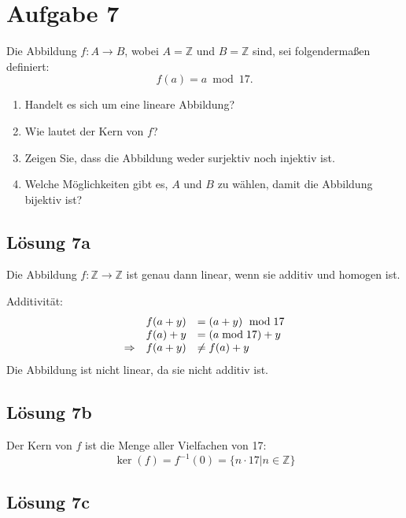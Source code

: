 \documentclass[main.tex]{subfiles}
\begin{document}
\section{Aufgabe 7}

Die Abbildung $f:A\rightarrow B$, wobei $A=\mathbb{Z}$ und $B=\mathbb{Z}$ sind, sei folgendermaßen definiert:
\begin{equation*}
    f( a) =a\bmod 17.
\end{equation*}

\begin{enumerate}
    \item Handelt es sich um eine lineare Abbildung?
    \item Wie lautet der Kern von $f$?
    \item Zeigen Sie, dass die Abbildung weder surjektiv noch injektiv ist.
    \item Welche Möglichkeiten gibt es, $A$ und $B$ zu wählen, damit die Abbildung bijektiv ist?
\end{enumerate}

\subsection{Lösung 7a}

Die Abbildung $f:\mathbb{Z}\rightarrow \mathbb{Z}$ ist genau dann linear, wenn sie additiv und homogen ist.

Additivität:
\begin{equation*}
\begin{array}{ r r l }
 & f( a+y) & =( a+y) \ \bmod 17\\
 & f( a) +y & =( a\bmod 17) +y\\
\Rightarrow  & f( a+y) & \neq f( a) +y
\end{array}
\end{equation*}
Die Abbildung ist nicht linear, da sie nicht additiv ist.


\subsection{Lösung 7b}
Der Kern von $f$ ist die Menge aller Vielfachen von 17:
\begin{equation*}
    \ker( f) =f^{-1}( 0) =\{n\cdotp 17 | n\in \mathbb{Z}\}
\end{equation*}

\subsection{Lösung 7c}
\end{document}
